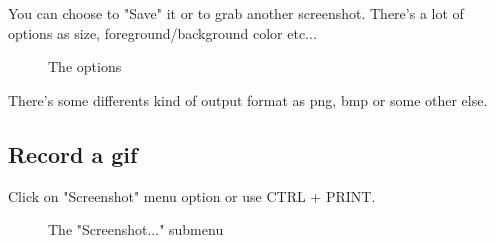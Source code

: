 \documentclass[10pt]{report}
\begin{document}
You can choose to "Save" it or to grab another screenshot.\newline
There's a lot of options as size, foreground/background color etc...\newline
\begin{figure}[H]
\centering
{}
\caption{The options}
\end{figure}

There's some differents kind of output format as png, bmp or some other else.\newline

\subsection{Record a gif}

Click on "Screenshot" menu option or use CTRL + PRINT.\newline
\begin{figure}[H]
\centering
{}
\caption{The "Screenshot..." submenu}
\end{figure}
\end{document}

